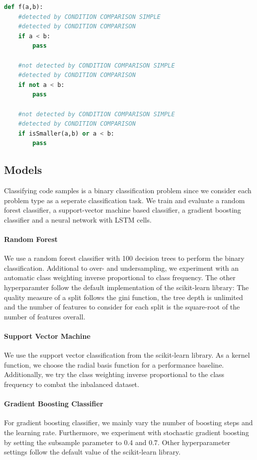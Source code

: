\begin{lstlisting}[language=Python, label=lst:conidtion_comparison_modified, caption={Sample statements for the differnce between the two analysis plugins CONDITION COMPARISON and CONDITION COMPARISON SIMPLE.  }]
    def f(a,b):
    #detected by CONDITION COMPARISON SIMPLE
    #detected by CONDITION COMPARISON
    if a < b:
        pass 

    #not detected by CONDITION COMPARISON SIMPLE
    #detected by CONDITION COMPARISON
    if not a < b:
        pass 

    #not detected by CONDITION COMPARISON SIMPLE
    #detected by CONDITION COMPARISON
    if isSmaller(a,b) or a < b:
        pass \end{lstlisting}

\subsection{Models}
Classifying code samples is a binary classification problem since we consider each problem type as a seperate classification task. We train and evaluate a random forest classifier, a support-vector machine based classifier, a gradient boosting classifier and a neural network with LSTM cells.

\paragraph{Random Forest}
We use a random forest classifier with 100 decision trees to perform the binary classification. Additional to over- and undersampling, we experiment with an automatic class weighting inverse proportional to class frequency. The other hyperparamter follow the default implementation of the scikit-learn library: The quality measure of a split follows the gini function, the tree depth is unlimited and the number of features to consider for each split is the square-root of the number of features overall.
\paragraph{Support Vector Machine}
We use the support vector classification from the scikit-learn library. As a kernel function, we choose the radial basis function for a performance baseline. Additionally, we try the class weighting inverse proportional to the class frequency to combat the inbalanced dataset.
\paragraph{Gradient Boosting Classifier}
For gradient boosting classifier, we mainly vary the number of boosting steps and the learning rate. Furthermore, we experiment with stochastic gradient boosting by setting the subsample parameter to 0.4 and 0.7. Other hyperparameter settings follow the default value of the scikit-learn library.
